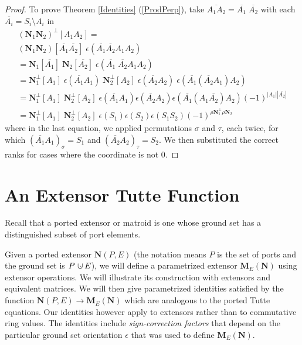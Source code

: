 \documentclass[12pt]{article}
\theoremstyle{definition}
\newcommand{\dunion}
{\mbox{\hbox{\hskip6pt$\cdot$\hskip-5.50pt$\cup$\hskip2pt}}}
\newcommand{\scomp}[1]{\ensuremath{\overline{#1}}}
\newcommand{\Card}[1]{\ensuremath{{\left|#1\right|}}}
\newcommand{\ext}[1]{\ensuremath{\mathbf{#1}}}
\begin{document}
\begin{proof}
To prove Theorem \ref{Identities} (\ref{ProdPerp}), take
$\scomp{A_1A_2}=\scomp{A_1}\;\scomp{A_2}$ with each 
$\scomp{A_i}=S_i\setminus A_i$ in
\begin{equation*}
\begin{split}
(\ext{N}_1 \ext{N}_2)^\perp[A_1 A_2]=\\
(\ext{N}_1 \ext{N}_2)[\scomp{A_1} \scomp{A_2}]\;
  \epsilon(\scomp{A_1} \scomp{A_2} A_1 A_2 )\\
=\ext{N}_1[\scomp{A_1}]\; \ext{N}_2 [\scomp{A_2}]\;
  \epsilon(\scomp{A_1}\;\scomp{A_2} A_1 A_2 )\\
=\ext{N}_1^\perp[A_1]\; \epsilon(\scomp{A_1}A_1)\;
 \ext{N}_2^\perp[A_2]\; \epsilon(\scomp{A_2}A_2)\;
  \epsilon(\scomp{A_1} (\scomp{A_2} A_1) A_2 )\\
=\ext{N}_1^\perp[A_1]\;  \ext{N}_2^\perp[A_2]\;
  \epsilon(\scomp{A_1}A_1)\epsilon(\scomp{A_2} A_2)
  \epsilon(\scomp{A_1} (A_1 \scomp{A_2})  A_2 )
  (-1)^{\Card{A_1}\Card{\scomp{A_2}}}\\
=\ext{N}_1^\perp[A_1]\;  \ext{N}_2^\perp[A_2]\;
  \epsilon(S_1)\epsilon(S_2)
  \epsilon(S_1 S_2)
  (-1)^{\rho\ext{N}_1^\perp\rho\ext{N}_2}
\end{split}
\end{equation*}
where in the last equation, we applied permutations $\sigma$
and $\tau$, each twice, for which $(\scomp{A_1}A_1)_\sigma=S_1$
and $(\scomp{A_2}A_2)_\tau=S_2$.  We then substituted the 
correct ranks for cases where the coordinate is not 0.
\end{proof}


\section{An  Extensor Tutte Function}
\label{Extensors}

Recall that a ported extensor or matroid is one whose ground set
has a distinguished subset of port elements.

Given a ported extensor $\ext{N}(P,E)$ (the notation means $P$ is
the set of ports and the ground set is $P\dunion E$), 
we will define a parametrized extensor $\ext{M}_E(\ext{N})$ 
using extensor operations.  We will illustrate its construction
with extensors and equivalent matrices.
We will then
give parametrized identities
satisfied by the function $\ext{N}(P,E)\rightarrow \ext{M}_E(\ext{N})$ which 
are analogous to the
ported Tutte equations.  
Our identities however apply to extensors rather than to commutative ring
values.  The identities include
\textit{sign-correction factors} that depend on the particular ground set
orientation $\epsilon$ that was used to define 
$\ext{M}_E(\ext{N})$.  
\end{document}
